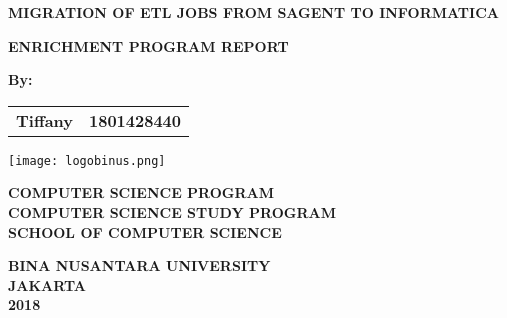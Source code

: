 \begin{titlepage}
\renewcommand{\baselinestretch}{1.5}\normalsize
    \begin{center}
        \textbf{MIGRATION OF ETL JOBS FROM SAGENT TO INFORMATICA}
        
        \vspace{1.5cm}
        \textbf{ENRICHMENT PROGRAM REPORT}
        
        \vspace{1.5cm}
        \textbf{By:}
        
        \begin{tabular}{ll}
        \textbf{Tiffany} & \textbf{1801428440}
        \end{tabular}
         
        \vfill
        
        \texttt{[image: logobinus.png]}
        
        \vspace{4cm}
        \textbf{COMPUTER SCIENCE PROGRAM}\\
        \textbf{COMPUTER SCIENCE STUDY PROGRAM}\\
        \textbf{SCHOOL OF COMPUTER SCIENCE}	
        
		\vspace{1.5cm}        
        
        \textbf{BINA NUSANTARA UNIVERSITY}\\
        \textbf{JAKARTA}\\
        \textbf{2018}
    \end{center}
\end{titlepage}